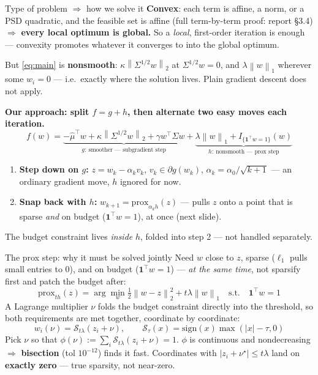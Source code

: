 \documentclass[aspectratio=169]{beamer}
\newcommand{\muhat}{\hat{\mu}}
\newcommand{\Sig}{\Sigma}
\newcommand{\Ssqrt}{\Sigma^{1/2}}
\newcommand{\one}{\mathbf{1}}
\newcommand{\norm}[1]{\left\lVert #1 \right\rVert}
\newcommand{\good}[1]{\textcolor{green!45!black}{\textbf{#1}}}
\begin{document}
\begin{frame}{Type of problem $\Rightarrow$ how we solve it}
  \small
  \textbf{Convex}: each term is affine, a norm, or a PSD quadratic, and the feasible set is
  affine (full term-by-term proof: report \S3.4) $\Rightarrow$ \textbf{every local optimum is
  global.} So a \emph{local}, first-order iteration is enough --- convexity promotes whatever
  it converges to into the global optimum.

  \vspace{0.15cm}
  But \cref{eq:main} is \textbf{nonsmooth}: $\kappa\norm{\Ssqrt w}_2$ at $\Ssqrt w=0$, and
  $\lambda\norm{w}_1$ wherever some $w_i=0$ --- i.e.\ exactly where the solution lives.
  Plain gradient descent does not apply.

  \vspace{0.15cm}
  \textbf{Our approach: split $f=g+h$, then alternate two easy moves each iteration.}
  \[
    f(w) = \underbrace{-\muhat^\top w + \kappa\norm{\Ssqrt w}_2 + \gamma w^\top\Sig w}
           _{g:\ \text{smoother --- subgradient step}}
         + \underbrace{\lambda\norm{w}_1 + I_{\{\one^\top w=1\}}(w)}_{h:\ \text{nonsmooth --- prox step}}
  \]
  \begin{enumerate}
    \item \textbf{Step down on $g$:} $z = w_k - \alpha_k v_k$, $v_k\in\partial g(w_k)$,
          $\alpha_k=\alpha_0/\sqrt{k+1}$ --- an ordinary gradient move, $h$ ignored for now.
    \item \textbf{Snap back with $h$:} $w_{k+1}=\mathrm{prox}_{\alpha_k h}(z)$ --- pulls $z$ onto
          a point that is sparse \emph{and} on budget ($\one^\top w=1$), at once (next slide).
  \end{enumerate}
  The budget constraint lives \emph{inside} $h$, folded into step 2 --- not handled separately.
\end{frame}

\begin{frame}{The prox step: why it must be solved jointly}
  \small
  Need $w$ close to $z$, sparse ($\ell_1$ pulls small entries to $0$), and on budget
  ($\one^\top w=1$) --- \emph{at the same time}, not sparsify first and patch the budget after:
  \[
    \mathrm{prox}_{th}(z) = \arg\min_w \tfrac12\norm{w-z}_2^2 + t\lambda\norm{w}_1
    \quad\text{s.t.}\quad \one^\top w = 1
  \]
  A Lagrange multiplier $\nu$ folds the budget constraint directly into the threshold, so both
  requirements are met together, coordinate by coordinate:
  \[
    w_i(\nu) = \mathcal{S}_{t\lambda}(z_i+\nu),
    \qquad \mathcal{S}_\tau(x)=\mathrm{sign}(x)\max(|x|-\tau,0)
  \]
  Pick $\nu$ so that $\phi(\nu):=\sum_i \mathcal S_{t\lambda}(z_i+\nu)=1$. $\phi$ is continuous
  and nondecreasing $\Rightarrow$ \textbf{bisection} (tol $10^{-12}$) finds it fast. Coordinates
  with $|z_i+\nu^\star|\le t\lambda$ land on \good{exactly zero} --- true sparsity, not
  near-zero.
\end{frame}
\end{document}
